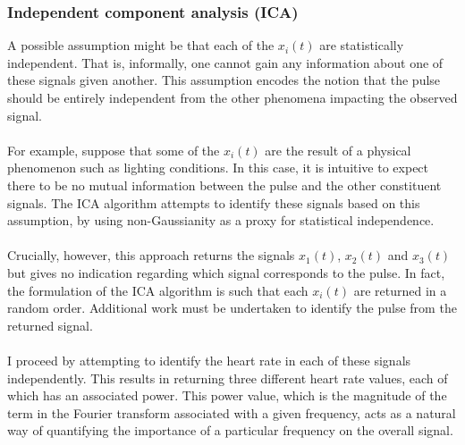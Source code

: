 \subsubsection{Independent component analysis (ICA)}
A possible assumption might be that each of the $x_i(t)$ are statistically independent. 
That is, informally, one cannot gain any information about one of these signals given another. 
This assumption encodes the notion that the pulse should be entirely independent from the other phenomena impacting the observed signal.
\\\\
For example, suppose that some of the $x_i(t)$ are the result of a physical phenomenon such as lighting conditions. In this case, it is intuitive to expect there to be no mutual information between the pulse and the other constituent signals. The ICA algorithm \cite{ica} attempts to identify these signals based on this assumption, by using non-Gaussianity as a proxy for statistical independence.
\\\\
Crucially, however, this approach returns the signals $x_1(t)$, $x_2(t)$ and $x_3(t)$ but gives no indication regarding which signal corresponds to the pulse. In fact, the formulation of the ICA algorithm is such that each $x_i(t)$ are returned in a random order. Additional work must be undertaken to identify the pulse from the returned signal. 
\\\\
I proceed by attempting to identify the heart rate in each of these signals independently. This results in returning three different heart rate values, each of which has an associated power.
This power value, which is the magnitude of the term in the Fourier transform associated with a given frequency, acts as a natural way of quantifying the importance of a particular frequency on the overall signal.
\begin{figure}[H]
    \centering
\end{figure}

